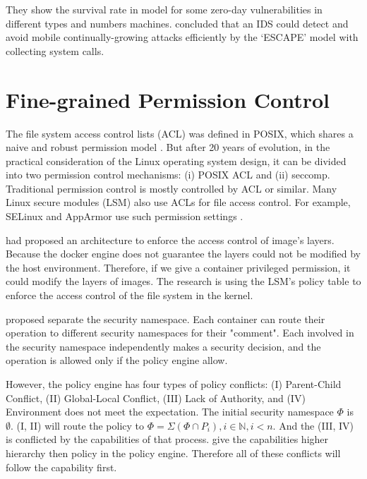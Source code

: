 They show the survival rate in \textcite{10.1007/978-3-319-24858-5_8} model for some
zero-day vulnerabilities in different types and numbers machines.
\textcite{7809699,7796855} concluded that an IDS could detect and avoid mobile continually-growing
attacks efficiently by the `ESCAPE' model with collecting system calls.

\section{Fine-grained Permission Control}

The file system access control lists (ACL) was defined in POSIX, which shares a naive and robust
permission model \cite{Grnbacher2003POSIXAC, 10.5555/3026877.3026930}. But after 20 years of
evolution, in the practical consideration of the Linux operating system design, it can be divided
into two permission control mechanisms: (\Rn{1}) POSIX ACL and (\Rn{2}) seccomp. Traditional
permission control is mostly controlled by ACL or similar. Many Linux secure modules (LSM) also
use ACLs for file access control\cite{Smalley2003ImplementingSA}. For example, SELinux and AppArmor
use such permission settings \cite{9184912, 217614, x11-SELinux, quteprints30563}.

\textcite{9184912} had proposed an architecture to enforce the access
control of image's layers. Because the docker engine does not guarantee the layers could
not be modified by the host environment. Therefore, if we give a container privileged
permission, it could modify the layers of images. The research \cite{9184912} is using
the LSM's policy table to enforce the access control of the file system in the kernel.

\textcite{217614} proposed separate the security namespace. Each container
can route their operation to different security namespaces for their "comment". Each
involved in the security namespace independently makes a security decision, and the
operation is allowed only if the policy engine allow.

However, the policy engine has four types of policy conflicts: (\RN{1}) Parent-Child Conflict,
(\RN{2}) Global-Local Conflict, (\RN{3}) Lack of Authority, and  (\RN{4}) Environment does not
meet the expectation. The initial security namespace $\Phi$ is $\emptyset$. (\RN{1},
\RN{2}) will route the policy to $\Phi = \Sigma (\Phi \cap P_i), i \in \mathbb{N}, i < n$.
And the (\RN{3}, \RN{4}) is conflicted by the capabilities of that process. \textcite{217614}
give the capabilities higher hierarchy then policy in the policy engine. Therefore
all of these conflicts will follow the capability first.


